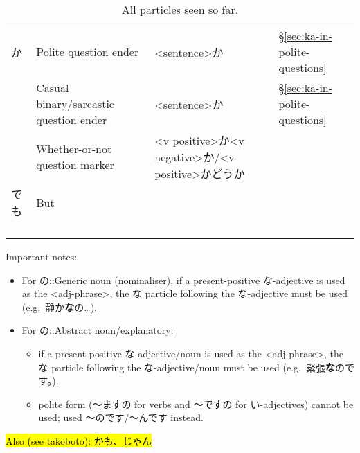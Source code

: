 \documentclass[../nihongo-gakushuu-kyouzai.tex]{subfiles}
\begin{document}
\begin{longtable}[c]{@{}llll@{}}
    か & Polite question ender & <sentence>か & \S\ref{sec:ka-in-polite-questions} \\
    & Casual binary/sarcastic question ender & <sentence>か & \S\ref{sec:ka-in-polite-questions} \\
    & Whether-or-not question marker & <v positive>か<v negative>か/<v positive>かどうか &  \\
    でも &  But &  &  \\
    &  &  &  \\
    &  &  &  \\
    &  &  &  \\
    \bottomrule
    \caption{All particles seen so far.}
    \label{tbl:} \\
\end{longtable}%
\normalsize

\color{red}
Important notes:
\begin{itemize}
    \item For の::Generic noun (nominaliser), if a present-positive な-adjective is used as the <adj-phrase>, the な particle following the な-adjective must be used (e.g.\ 静か\textbf{な}の\dots).
    \item For の::Abstract noun/explanatory:
    \begin{itemize}
        \item if a present-positive な-adjective/noun is used as the <adj-phrase>, the な particle following the な-adjective/noun must be used (e.g.\ 緊張\textbf{な}のです。).
        \item polite form (〜ますの for verbs and 〜ですの for い-adjectives) cannot be used; used 〜のです/〜んです instead.
    \end{itemize}
\end{itemize}
\color{black}

\hl{Also (see takoboto): かも、じゃん}
\end{document}
